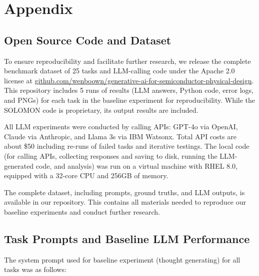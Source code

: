 \documentclass{article}
\begin{document}


\newpage
\appendix

\section{Appendix}
\subsection{Open Source Code and Dataset}
\label{appendix:code_and_dataset}

To ensure reproducibility and facilitate further research, we release the complete benchmark dataset of 25 tasks and LLM-calling code under the Apache 2.0 license at \url{github.com/wenboown/generative-ai-for-semiconductor-physical-design}. This repository includes 5 runs of results (LLM answers, Python code, error logs, and PNGs) for each task in the baseline experiment for reproducibility. While the SOLOMON code is proprietary, its output results are included.

All LLM experiments were conducted by calling APIs: GPT-4o via OpenAI, Claude via Anthropic, and Llama 3s via IBM Watsonx. Total API costs are about \$50 including re-runs of failed tasks and iterative testings. The local code (for calling APIs, collecting responses and saving to disk, running the LLM-generated code, and analysis) was run on a virtual machine with RHEL 8.0, equipped with a 32-core CPU and 256GB of memory.

The complete dataset, including prompts, ground truths, and LLM outputs, is available in our repository. This contains all materials needed to reproduce our baseline experiments and conduct further research.

\subsection{Task Prompts and Baseline LLM Performance}
\label{appendix:task_prompts_and_performance}

The system prompt used for baseline experiment (thought generating) for all tasks was as follows:
\end{document}
